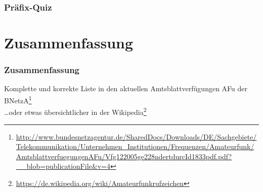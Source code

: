 \begin{frame}
  \frametitle{Präfix-Quiz}

  \begin{exampleblock}{
    \LARGE
    \begin{center}
    \end{center}
    }
    \Large
    \begin{center}
    \end{center}
  \end{exampleblock}

\end{frame}

\section[]{Zusammen\-fassung}

\begin{frame}
  \frametitle{Zusammenfassung}

  Komplette und korrekte Liste in den aktuellen Amtsblattverfügungen AFu der
  BNetzA\footnote{\ExternalLink\url{http://www.bundesnetzagentur.de/SharedDocs/Downloads/DE/Sachgebiete/Telekommunikation/Unternehmen_Institutionen/Frequenzen/Amateurfunk/AmtsblattverfuegungenAFu/Vfg122005ge228ndertdurcId1833pdf.pdf?__blob=publicationFile&v=4}}\\[2em]

  \dots oder etwas übersichtlicher in der Wikipedia\footnote{\ExternalLink\url{https://de.wikipedia.org/wiki/Amateurfunkrufzeichen}}

\end{frame}

